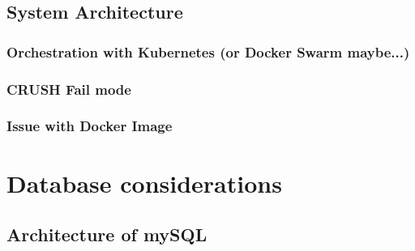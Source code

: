 \documentclass[titlepage, a4paper, 11pt]{scrartcl}
\begin{document}
        \subsection{System Architecture}


            \subsubsection{Orchestration with Kubernetes (or Docker Swarm maybe...)}

            \subsubsection{CRUSH Fail mode}




            \subsubsection{Issue with Docker Image}



        
    \section{Database considerations}

        \subsection{Architecture of mySQL}

\end{document}
